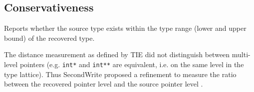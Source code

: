 
\subsection{Conservativeness}

Reports whether the source type exists within the type range (lower and upper bound) of the recovered type.

The distance measurement as defined by TIE did not distinguish between multi-level pointers (e.g. \texttt{int*} and \texttt{int**} are equivalent, i.e. on the same level in the type lattice). Thus SecondWrite proposed a refinement to measure the ratio between the recovered pointer level and the source pointer level \cite{second_write_scalable_type_detection}.
